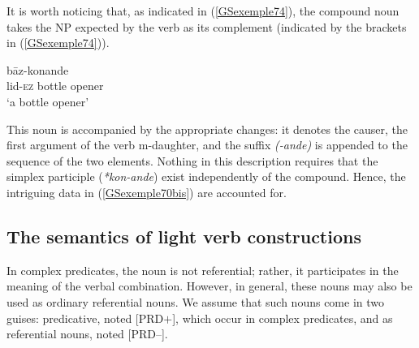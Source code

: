 \ea
{}
\label{GSexemple73}
\z

\largerpage[2]
It is worth noticing that, as indicated in (\ref{GSexemple74}), the compound noun takes the NP
expected by the verb as its complement (indicated by the brackets in (\ref{GSexemple74})).

\ea
\label{GSexemple74}
 b\=az-konande\\
     \spacebr{}lid-\textsc{ez} bottle opener\\
\glt `a bottle opener'
\z

\noindent
This noun is accompanied by the appropriate changes: it denotes the causer, the
first argument of the verb m-daughter, and the suffix \emph{(-ande)} is appended to the sequence of
the two elements. Nothing in this description requires that the simplex participle
(\emph{*kon-ande}) exist independently of the compound. Hence, the intriguing data in
(\ref{GSexemple70bis}) are accounted for.

\subsection{The semantics of light verb constructions}\label{GSsection5.3}

In complex predicates, the noun is not referential; rather, it participates in the meaning of the verbal combination. However, in general, these nouns may also be used as ordinary referential nouns. We assume that such nouns come in two guises: predicative, noted [PRD$+$], which occur in complex predicates, and as referential nouns, noted [PRD$–$].

